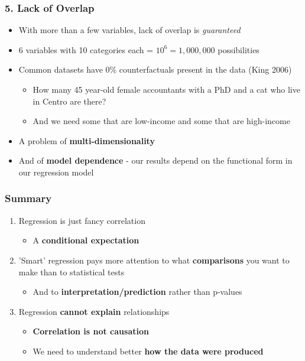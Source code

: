 \documentclass[xcolor=x11names,compress]{beamer}\usepackage[]{graphicx}\usepackage[]{color}
\renewcommand{\(}{\begin{columns}}
\renewcommand{\)}{\end{columns}}
\newcommand{\<}[1]{\begin{column}{#1}}
\renewcommand{\>}{\end{column}}
\begin{document}
\begin{frame}
\frametitle{5. Lack of Overlap}
\begin{itemize}
\item With more than a few variables, lack of overlap is \textit{guaranteed}
\item 6 variables with 10 categories each = $10^6 = 1,000,000$ possibilities
\item Common datasets have 0\% counterfactuals present in the data (King 2006)
\begin{itemize}
\item How many 45 year-old female accountants with a PhD and a cat who live in Centro are there?
\item And we need some that are low-income and some that are high-income
\end{itemize}
\item A problem of \textbf{multi-dimensionality}
\item And of \textbf{model dependence} - our results depend on the functional form in our regression model
\end{itemize}
\end{frame}

\begin{frame}
\frametitle{Summary}
\begin{enumerate}
\item Regression is just fancy correlation
\begin{itemize}
\item A \textbf{conditional expectation}
\end{itemize}
\item 'Smart' regression pays more attention to what \textbf{comparisons} you want to make than to statistical tests
\begin{itemize}
\item And to \textbf{interpretation/prediction} rather than p-values
\end{itemize}
\item Regression \textbf{cannot explain} relationships
\begin{itemize}
\item \textbf{Correlation is not causation}
\item We need to understand better \textbf{how the data were produced}
\end{itemize}
\end{enumerate}
\end{frame}
\end{document}
